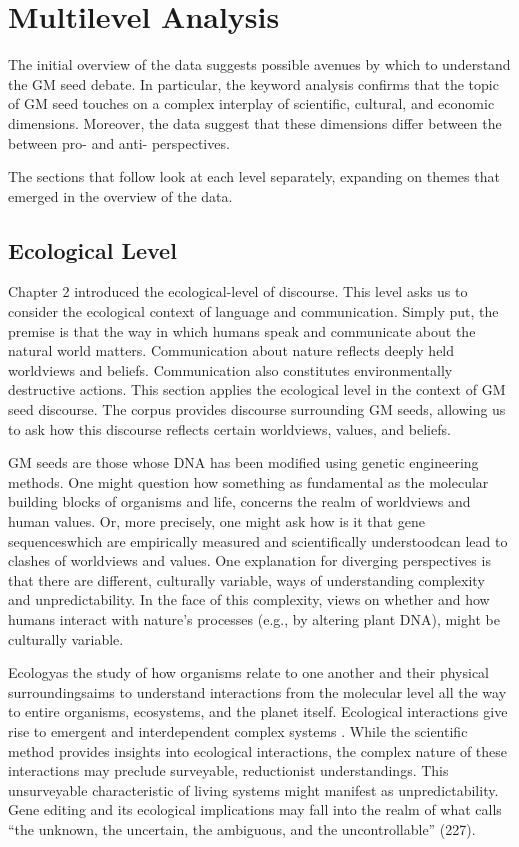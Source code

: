\section{Multilevel Analysis}

The initial overview of the data suggests possible avenues by which to understand the GM seed debate. In particular, the keyword analysis confirms that the topic of GM seed touches on a complex interplay of scientific, cultural, and economic dimensions. Moreover, the data suggest that these dimensions differ between the between pro- and anti- perspectives.

The sections that follow look at each level separately, expanding on themes that emerged in the overview of the data.

\subsection{Ecological Level}

Chapter 2 introduced the ecological-level of discourse. This level asks us to consider the ecological context of language and communication. Simply put, the premise is that the way in which humans speak and communicate about the natural world matters. Communication about nature reflects deeply held worldviews and beliefs. Communication also constitutes environmentally destructive actions. This section applies the ecological level in the context of GM seed discourse. The corpus provides discourse surrounding GM seeds, allowing us to ask how this discourse reflects certain worldviews, values, and beliefs.  

GM seeds are those whose DNA has been modified using genetic engineering methods. One might question how something as fundamental as the molecular building blocks of organisms and life, concerns the realm of worldviews and human values. Or, more precisely, one might ask how is it that gene sequences\textemdash which are empirically measured and scientifically understood\textemdash can lead to clashes of worldviews and values. One explanation for diverging perspectives is that there are different, culturally variable, ways of understanding complexity and unpredictability. In the face of this complexity, views on whether and how humans interact with nature's processes (e.g., by altering plant DNA), might be culturally variable.

Ecology\textemdash as the study of how organisms relate to one another and their physical surroundings\textemdash aims to understand interactions from the molecular level all the way to entire organisms, ecosystems, and the planet itself. Ecological interactions give rise to emergent and interdependent complex systems \citep{Bar-Yam2002a}. While the scientific method provides insights into ecological interactions, the complex nature of these interactions may preclude surveyable, reductionist understandings. This unsurveyable characteristic of living systems might manifest as unpredictability. Gene editing and its ecological implications may fall into the realm of what \cite*{Jasanoff2003a} calls ``the unknown, the uncertain, the ambiguous, and the uncontrollable'' (227). 

